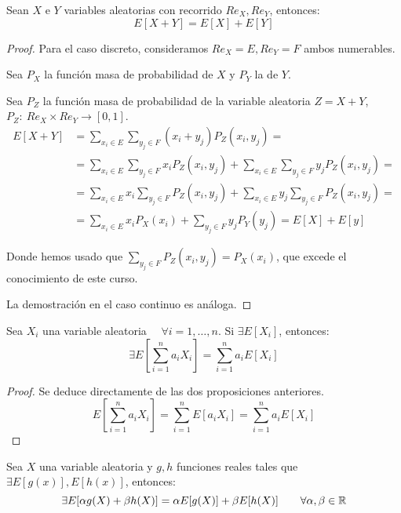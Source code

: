 \begin{prop}
    Sean $X$ e $Y$ variables aleatorias con recorrido $Re_X, Re_Y$, entonces: $$E[X+Y]=E[X]+E[Y]$$
\end{prop}
\begin{proof} 
    Para el caso discreto, consideramos $Re_X = E, Re_Y = F$ ambos numerables.
    
    Sea $P_X$ la función masa de probabilidad de $X$ y $P_Y$ la de $Y$.
    
    Sea $P_Z$ la función masa de probabilidad de la variable aleatoria $Z=X+Y$, $P_Z:~Re_X \times Re_Y
    \rightarrow [0,1]$.
    \begin{equation*}
        \begin{split}
            E[X+Y] &= \sum_{x_i \in E} \sum_{y_j \in F} (x_i+y_j) P_Z(x_i, y_j) =\\
            &=\sum_{x_i \in E} \sum_{y_j \in F} x_i P_Z(x_i, y_j) + \sum_{x_i \in E} \sum_{y_j \in F} y_j P_Z(x_i, y_j) = \\
            &=\sum_{x_i \in E} x_i \sum_{y_j \in F}P_Z(x_i, y_j) + \sum_{x_i \in E} y_j \sum_{y_j \in F} P_Z(x_i, y_j) =\\
            &= \sum_{x_i \in E}x_i P_X(x_i) +\sum_{y_j \in F}y_j P_Y(y_j) = E[X] + E[y]
        \end{split}
    \end{equation*}
    
    Donde hemos usado que $\sum\limits_{y_j \in F}P_Z(x_i, y_j) = P_X(x_i)$, que excede el conocimiento de este curso.

    La demostración en el caso continuo es análoga.
\end{proof}

\begin{coro}[Linealidad]
    Sea $X_i$ una variable aleatoria $\quad \forall i=1,\dots, n$. Si $\exists E[X_i]$, entonces:
    \begin{equation*}
        \exists E\left[\sum_{i=1}^n a_iX_i\right] = \sum_{i=1}^n a_iE[X_i]
    \end{equation*}
\end{coro}
\begin{proof}
    Se deduce directamente de las dos proposiciones anteriores.
    \begin{equation*}
        E\left[\sum_{i=1}^n a_iX_i\right] = \sum_{i=1}^n E[a_iX_i] = \sum_{i=1}^n a_iE[X_i]
    \end{equation*}
\end{proof}
\begin{coro}
    Sea $X$ una variable aleatoria y $g, h$ funciones reales tales que $\exists E[g(x)], E[h(x)]$, entonces:
    $$\exists E[\alpha g(X) + \beta h(X)] = \alpha E[g(X)] + \beta E[h(X)] \qquad \forall \alpha, \beta \in \mathbb R$$
\end{coro}

